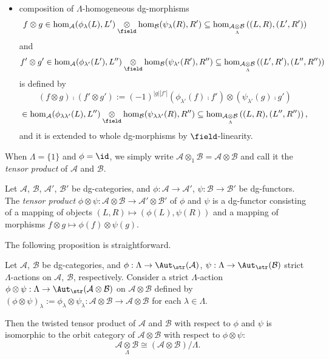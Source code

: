 \begin{defn}
\begin{itemize}
\item
composition of
$\Lambda$-homogeneous
dg-morphisms
$$
f\otimes g
\in
\hom_{\mathcal{A}}(\phi_{\lambda}(L),L')
\underset{\field}{\otimes}
\hom_{\mathcal{B}}(\psi_{\lambda}(R),R')
\subseteq
\hom_{\mathcal{A}\underset{\Lambda}{\otimes}\mathcal{B}}
\left((L,R),(L',R')\right)
$$
and
$$
f'\otimes g'
\in
\hom_{\mathcal{A}}(\phi_{\lambda'}(L'),L'')
\underset{\field}{\otimes}
\hom_{\mathcal{B}}(\psi_{\lambda'}(R'),R'')
\subseteq
\hom_{\mathcal{A}\underset{\Lambda}{\otimes}\mathcal{B}}
\left((L',R'),(L'',R'')\right)
$$
is defined by
$$
(f\otimes g)\comp(f'\otimes g')
:=
(-1)^{|g||f'|}
(\phi_{\lambda'}(f)\comp f')
\otimes
(\psi_{\lambda'}(g)\comp g')
$$
$$
\in
\hom_{\mathcal{A}}(\phi_{\lambda\lambda'}(L),L'')
\underset{\field}{\otimes}
\hom_{\mathcal{B}}(\psi_{\lambda\lambda'}(R),R'')
\subseteq
\hom_{\mathcal{A}\underset{\Lambda}{\otimes}\mathcal{B}}
\left((L,R),(L'',R'')\right),
$$
and it is extended to whole dg-morphisms by $\field$-linearity.
\end{itemize}
When $\Lambda=\{1\}$ and $\phi=\id$, we simply write $\mathcal{A}\otimes_1\mathcal{B} =\mathcal{A}\otimes\mathcal{B}$ and call it the \emph{tensor product} of $\mathcal{A}$ and $\mathcal{B}$.
\end{defn}
\begin{defn}
Let $\mathcal{A}$, $\mathcal{B}$, $\mathcal{A}'$, $\mathcal{B}'$ be dg-categories,
and
$\phi:\mathcal{A}\rightarrow\mathcal{A}'$,
$\psi:\mathcal{B}\rightarrow\mathcal{B}'$
be
dg-functors.
The \emph{tensor product}
$\phi\otimes\psi
:
\mathcal{A}\otimes\mathcal{B}
\rightarrow
\mathcal{A}'\otimes\mathcal{B}'
$
of $\phi$ and $\psi$
is a dg-functor
consisting of
a mapping of objects
$
(L,R)\mapsto (\phi(L),\psi(R))
$
and
a mapping of morphisms
$
f\otimes g \mapsto \phi(f)\otimes\psi(g).
$
\end{defn}
The following proposition is straightforward.
\begin{prp}\label{prp:twisted-tensor-equal-quotient}
Let $\mathcal{A}$, $\mathcal{B}$ be dg-categories,
and
$\phi:\Lambda\rightarrow\Aut_{\str}(\mathcal{A})$,
$\psi:\Lambda\rightarrow\Aut_{\str}(\mathcal{B})$
strict $\Lambda$-actions on $\mathcal{A}$, $\mathcal{B}$,
respectively.
Consider a strict $\Lambda$-action
$\phi\otimes \psi:\Lambda\rightarrow\Aut_{\str}(\mathcal{A}\otimes\mathcal{B})$
on $\mathcal{A}\otimes\mathcal{B}$
defined by
$(\phi\otimes\psi)_{\lambda}:=\phi_{\lambda}\otimes \psi_{\lambda}
:
\mathcal{A}\otimes\mathcal{B}\rightarrow\mathcal{A}\otimes\mathcal{B}$
for each $\lambda\in\Lambda$.

Then the twisted tensor product of $\mathcal{A}$ and $\mathcal{B}$
with respect to $\phi$ and $\psi$
is isomorphic to
the orbit category of $\mathcal{A}\otimes\mathcal{B}$
with respect to $\phi\otimes\psi$:
$$
\mathcal{A}\underset{\Lambda}{\otimes}\mathcal{B}
\cong
(\mathcal{A}\otimes\mathcal{B})/\Lambda.
$$
\end{prp}


